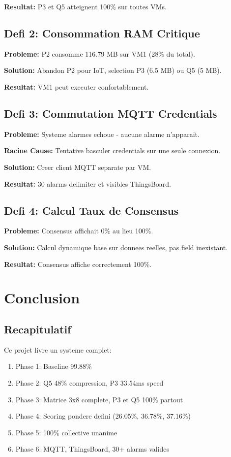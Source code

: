 \documentclass[12pt,a4paper]{report}
\begin{document}
\textbf{Resultat:} P3 et Q5 atteignent 100\% sur toutes VMs.

\section{Defi 2: Consommation RAM Critique}

\textbf{Probleme:} P2 consomme 116.79 MB sur VM1 (28\% du total).

\textbf{Solution:} Abandon P2 pour IoT, selection P3 (6.5 MB) ou Q5 (5 MB).

\textbf{Resultat:} VM1 peut executer confortablement.

\section{Defi 3: Commutation MQTT Credentials}

\textbf{Probleme:} Systeme alarmes echoue - aucune alarme n'apparait.

\textbf{Racine Cause:} Tentative basculer credentials sur une seule connexion.

\textbf{Solution:} Creer client MQTT separate par VM.

\textbf{Resultat:} 30 alarms delimiter et visibles ThingsBoard.

\section{Defi 4: Calcul Taux de Consensus}

\textbf{Probleme:} Consensus affichait 0\% au lieu 100\%.

\textbf{Solution:} Calcul dynamique base sur donnees reelles, pas field inexistant.

\textbf{Resultat:} Consensus affiche correctement 100\%.

\chapter{Conclusion}

\section{Recapitulatif}

Ce projet livre un systeme complet:

\begin{enumerate}
    \item Phase 1: Baseline 99.88\%
    \item Phase 2: Q5 48\% compression, P3 33.54ms speed
    \item Phase 3: Matrice 3x8 complete, P3 et Q5 100\% partout
    \item Phase 4: Scoring pondere defini (26.05\%, 36.78\%, 37.16\%)
    \item Phase 5: 100\% collective unanime
    \item Phase 6: MQTT, ThingsBoard, 30+ alarms valides
\end{enumerate}
\end{document}
